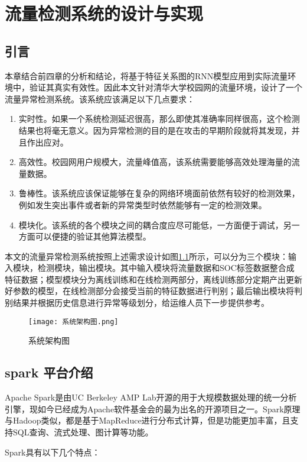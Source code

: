 \chapter{流量检测系统的设计与实现}
\section{引言}
本章结合前四章的分析和结论，将基于特征关系图的RNN模型应用到实际流量环境中，验证其真实有效性。因此本文针对清华大学校园网的流量环境，设计了一个流量异常检测系统。该系统应该满足以下几点要求：
\begin{enumerate}
  \item 实时性。如果一个系统检测延迟很高，那么即使其准确率同样很高，这个检测结果也将毫无意义。因为异常检测的目的是在攻击的早期阶段就将其发现，并且作出应对。
  \item 高效性。校园网用户规模大，流量峰值高，该系统需要能够高效处理海量的流量数据。
  \item 鲁棒性。该系统应该保证能够在复杂的网络环境面前依然有较好的检测效果，例如发生突出事件或者新的异常类型时依然能够有一定的检测效果。
  \item 模块化。该系统的各个模块之间的耦合度应尽可能低，一方面便于调试，另一方面可以便捷的验证其他算法模型。
\end{enumerate}

本文的流量异常检测系统按照上述需求设计如图\ref{fig:arch}所示，可以分为三个模块：输入模块，检测模块，输出模块。其中输入模块将流量数据和SOC标签数据整合成特征数据；模型模块分为离线训练和在线检测两部分，离线训练部分定期产出更新好参数的模型，在线检测部分会接受当前的特征数据进行判别；最后输出模块将判别结果并根据历史信息进行异常等级划分，给运维人员下一步提供参考。
\begin{figure}
    \centering
    \texttt{[image: 系统架构图.png]}
    \caption{系统架构图}
    \label{fig:arch}
  \end{figure}


\section{spark 平台介绍}
Apache Spark是由UC Berkeley AMP Lab开源的用于大规模数据处理的统一分析引擎\cite{spark}，现如今已经成为Apache软件基金会的最为出名的开源项目之一。Spark原理与Hadoop类似，都是基于MapReduce进行分布式计算，但是功能更加丰富，且支持SQL查询、流式处理、图计算等功能。

Spark具有以下几个特点：

